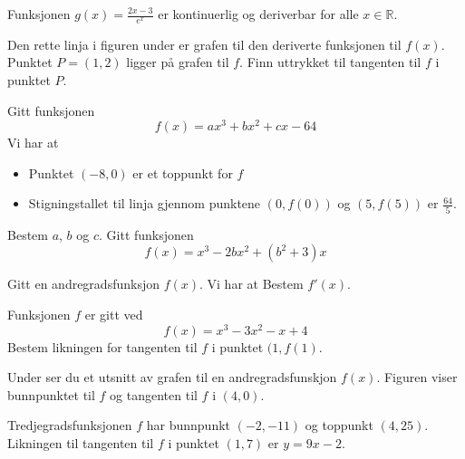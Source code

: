 Funksjonen $g(x)=\frac{2x-3}{e^x}$ er kontinuerlig og deriverbar for alle ${x\in \mathbb{R}}$.


	Den rette linja i figuren under er grafen til den deriverte funksjonen til $f(x)$. Punktet $P=(1, 2)$ ligger på grafen til $f$. Finn uttrykket til tangenten til $f$ i punktet $P$.

Gitt funksjonen
\[ f(x)=ax^3+bx^2+cx-64 \]
Vi har at
\begin{itemize}
	\item Punktet $(-8, 0)$ er et toppunkt for $f$
	\item Stigningstallet til linja gjennom punktene $(0, f(0))$ og $(5, f(5))$ er $\frac{64}{5}$.
\end{itemize}
Bestem $a$, $b$ og $c$.
\newpage
{}
Gitt funksjonen
\[ f(x)=x^3-2bx^2+(b^2+3)x	 \]

Gitt en andregradsfunksjon $f(x)$. Vi har at
Bestem $f'(x)$.

Funksjonen $ f $ er gitt ved
\[ f(x)=x^3-3x^2-x+4\]
Bestem likningen for tangenten til $ f $ i punktet $ (1, f(1) $.

Under ser du et utsnitt av grafen til en andregradsfunskjon $f(x)$. Figuren viser bunnpunktet til $f$ og tangenten til $f$ i $(4, 0)$.

Tredjegradsfunksjonen $f$ har bunnpunkt $(-2, -11)$ og toppunkt $(4, 25)$. Likningen til tangenten til $f$ i punktet $(1, 7)$ er $y=9x-2$. \os

